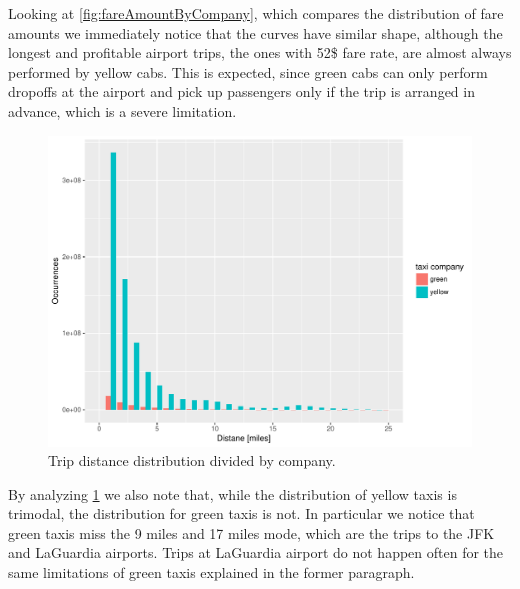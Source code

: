 \documentclass{acm_proc_article-sp-sigmod09}
\begin{document}
Looking at \cref{fig:fareAmountByCompany}, which compares the distribution of fare amounts we immediately notice that the curves have similar shape, although the longest and profitable airport trips, the ones with 52\$ fare rate, are almost always performed by yellow cabs. This is expected, since green cabs can only perform dropoffs at the airport and pick up passengers only if the trip is arranged in advance, which is a severe limitation.

\begin{figure}
	\centering
	\includegraphics[width=1\columnwidth]{resources/base_plots/trip_distance_by_company_distr.pdf}
	\caption{Trip distance distribution divided by company.}
	\label{fig:tripDistanceByCompany}
\end{figure}

By analyzing \cref{fig:tripDistanceByCompany} we also note that, while the distribution of yellow taxis is trimodal, the distribution for green taxis is not. In particular we notice that green taxis miss the 9 miles and 17 miles mode, which are the trips to the JFK and LaGuardia airports. Trips at LaGuardia airport do not happen often for the same limitations of green taxis explained in the former paragraph.
\end{document}

